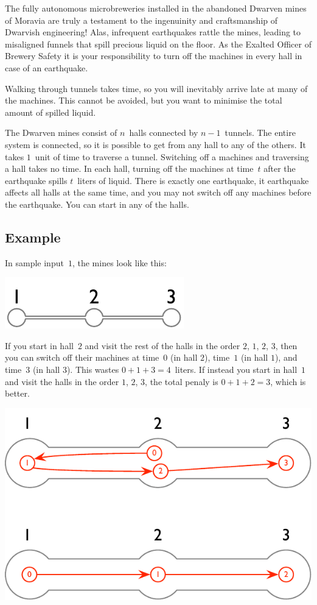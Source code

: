 
The fully autonomous microbreweries installed in the abandoned Dwarven mines of Moravia are truly a testament to the ingenuinity and craftsmanship of Dwarvish engineering!
Alas, infrequent earthquakes rattle the mines, leading to misaligned funnels that spill precious liquid on the floor.
As the Exalted Officer of Brewery Safety it is your responsibility to turn off the machines in every hall in case of an earthquake.

Walking through tunnels takes time, 
so you will inevitably arrive late at many of the machines.
This cannot be avoided, but you want to minimise the total amount of spilled liquid.

\medskip
The Dwarven mines consist of $n$~halls connected by $n-1$~tunnels.
The entire system is connected, so it is possible to get from any hall to any of the others.
It takes $1$~unit of time to traverse a tunnel.
Switching off a machines and traversing a hall takes no time.
In each hall, turning off the machines at time~$t$ after the earthquake spills $t$~liters of liquid.
There is exactly one earthquake, it earthquake affects all halls at the same time, and you may not switch off any machines before the earthquake.
You can start in any of the halls.

\subsection*{Example}

In sample input~$1$, the mines look like this:

\includegraphics[width=.15\textwidth]{img/sample-1.pdf}

If you start in hall~$2$ and visit the rest of the halls in the order $2$, $1$, $2$, $3$, then you can switch off their machines at time~$0$ (in hall $2$), time~$1$ (in hall $1$), and time~$3$ (in hall $3$).
This wastes $0+1+3=4$~liters.
If instead you start in hall~$1$ and visit the halls in the order $1$, $2$, $3$, the total penaly is $0+1+2=3$, which is better.

\includegraphics[width=.35\textwidth]{img/sample-1-ans.pdf}

